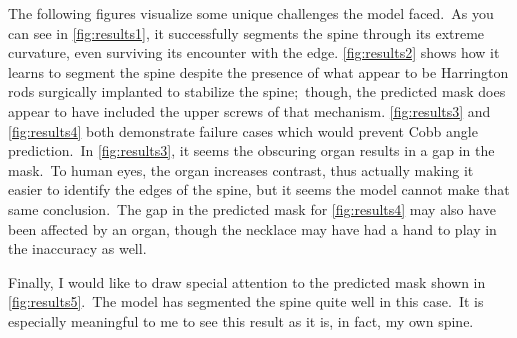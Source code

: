 \documentclass[conference]{IEEEtran}
\begin{document}
    The following figures visualize some unique challenges the model faced.\ As you can see in \autoref{fig:results1}, it successfully segments the spine through its extreme curvature, even surviving its encounter with the edge. \autoref{fig:results2} shows how it learns to segment the spine despite the presence of what appear to be Harrington rods surgically implanted to stabilize the spine;\ though, the predicted mask does appear to have included the upper screws of that mechanism. \autoref{fig:results3} and \autoref{fig:results4} both demonstrate failure cases which would prevent Cobb angle prediction.\ In \autoref{fig:results3}, it seems the obscuring organ results in a gap in the mask.\ To human eyes, the organ increases contrast, thus actually making it easier to identify the edges of the spine, but it seems the model cannot make that same conclusion.\ The gap in the predicted mask for \autoref{fig:results4} may also have been affected by an organ, though the necklace may have had a hand to play in the inaccuracy as well.

    Finally, I would like to draw special attention to the predicted mask shown in \autoref{fig:results5}.\ The model has segmented the spine quite well in this case.\ It is especially meaningful to me to see this result as it is, in fact, my own spine.
\end{document}
